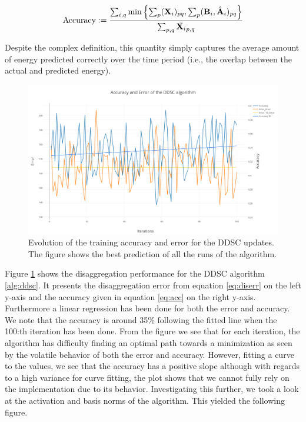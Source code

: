 \begin{equation}
\label{eq:acc}
\text{Accuracy} \vcentcolon=  \frac{\sum_{i,q} \min \left\{ \sum_p ( \mathbf{X}_i)_{pq}, \sum_p ( \mathbf{B}_i,\hat{\mathbf{A}}_i)_{pq} \right\}}{\sum_{p,q} \bar{\mathbf{X}_i}_{p,q}}
\end{equation}

Despite the complex definition, this quantity simply captures the average amount of energy predicted correctly over the time period (i.e., the overlap between the actual and predicted energy).

\begin{figure}[H]
	\centering
	\includegraphics[scale=0.45]{./figures/acc_err_ddsc}
	\caption{Evolution of the training accuracy and error for the DDSC updates. The figure shows the best prediction of all the runs of the algorithm.}
	\label{fig:acc_err_ddsc}
\end{figure}

Figure \ref{fig:acc_err_ddsc} shows the disaggregation performance for the DDSC algorithm \ref{alg:ddsc}. It presents the disaggregation error from equation \ref{eq:diserr} on the left y-axis and the accuracy given in equation \ref{eq:acc} on the right y-axis. Furthermore a linear regression has been done for both the error and accuracy. We note that the accuracy is around 35\% following the fitted line when the 100:th iteration has been done. From the figure we see that for each iteration, the algorithm has difficulty finding an optimal path towards a minimization as seen by the volatile behavior of both the error and accuracy. However, fitting a curve to the values, we see that the accuracy has a positive slope although with regards to a high variance for curve fitting, the plot shows that we cannot fully rely on the implementation due to its behavior. Investigating this further, we took a look at the activation and basis norms of the algorithm. This yielded the following figure.

